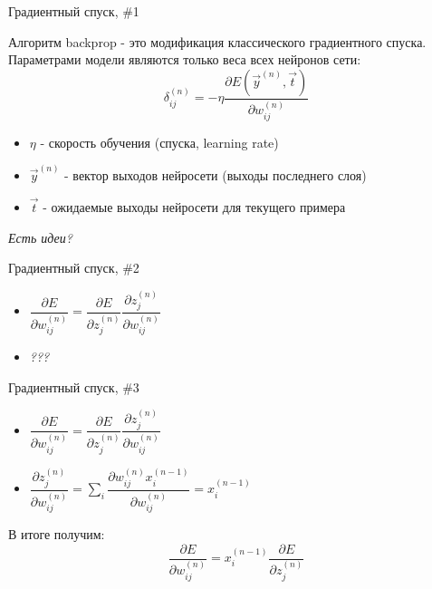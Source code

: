 \documentclass[10pt]{beamer}
\begin{document}
\begin{frame}{Градиентный спуск, \#1}

Алгоритм backprop - это модификация классического градиентного спуска. Параметрами модели являются только веса всех нейронов сети:
\begin{equation}\label{eq:delta}
	\delta^{(n)}_{ij} = -\eta \dfrac{\partial E\left( \vec y^{(n)}, \vec t \right)}{\partial w^{(n)}_{ij}}
\end{equation}
\begin{itemize}
	\item $\eta$ - скорость обучения (спуска, learning rate)
	\item $\vec y^{(n)}$ - вектор выходов нейросети (выходы последнего слоя)
	\item $\vec t$ - ожидаемые выходы нейросети для текущего примера
\end{itemize}
\textit{Есть идеи?}

\end{frame}


\begin{frame}[t]{Градиентный спуск, \#2}

\begin{itemize}
	\item $\dfrac{\partial E}{\partial w^{(n)}_{ij}} = \dfrac{\partial E}{\partial z^{(n)}_j} \dfrac{\partial z^{(n)}_j}{\partial w^{(n)}_{ij}}$
	\item \textit{???}
\end{itemize}

\end{frame}


\begin{frame}[t]{Градиентный спуск, \#3}

\begin{itemize}
	\item $\dfrac{\partial E}{\partial w^{(n)}_{ij}} = \dfrac{\partial E}{\partial z^{(n)}_j} \dfrac{\partial z^{(n)}_j}{\partial w^{(n)}_{ij}}$
	\item $\dfrac{\partial z^{(n)}_j}{\partial w^{(n)}_{ij}} = \sum_i \dfrac{\partial w^{(n)}_{ij} x_i^{(n - 1)}}{\partial w^{(n)}_{ij}} = x_i^{(n - 1)}$
\end{itemize}
В итоге получим: 
\begin{equation}\label{eq:de_dw}
	\dfrac{\partial E}{\partial w^{(n)}_{ij}} = x_i^{(n - 1)} \dfrac{\partial E}{\partial z^{(n)}_j}
\end{equation}

\end{frame}
\end{document}
